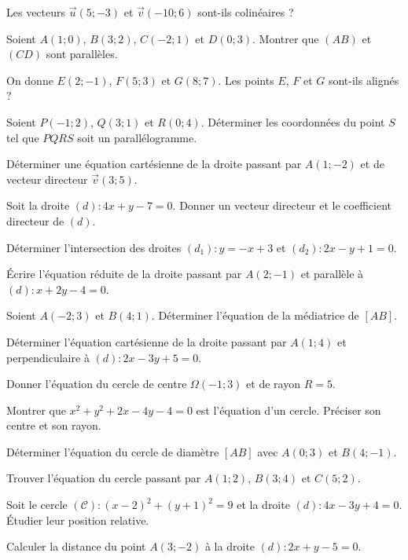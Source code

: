 \exo{}
Les vecteurs $\vec{u}(5; -3)$ et $\vec{v}(-10; 6)$ sont-ils colinéaires ?

\exo{}
Soient $A(1; 0)$, $B(3; 2)$, $C(-2; 1)$ et $D(0; 3)$. Montrer que $(AB)$ et $(CD)$ sont parallèles.

\exo{}
On donne $E(2; -1)$, $F(5; 3)$ et $G(8; 7)$. Les points $E$, $F$ et $G$ sont-ils alignés ?

\exo{}
Soient $P(-1; 2)$, $Q(3; 1)$ et $R(0; 4)$. Déterminer les coordonnées du point $S$ tel que $PQRS$ soit un parallélogramme.


\exo{}
Déterminer une équation cartésienne de la droite passant par $A(1; -2)$ et de vecteur directeur $\vec{v}(3; 5)$.

\exo{}
Soit la droite $(d) : 4x + y - 7 = 0$. Donner un vecteur directeur et le coefficient directeur de $(d)$.

\exo{}
Déterminer l'intersection des droites $(d_1) : y = -x + 3$ et $(d_2) : 2x - y + 1 = 0$.

\exo{}
Écrire l'équation réduite de la droite passant par $A(2; -1)$ et parallèle à $(d) : x + 2y - 4 = 0$.

\exo{}
Soient $A(-2; 3)$ et $B(4; 1)$. Déterminer l'équation de la médiatrice de $[AB]$.

\exo{}
Déterminer l'équation cartésienne de la droite passant par $A(1; 4)$ et perpendiculaire à $(d) : 2x - 3y + 5 = 0$.


\exo{}
Donner l'équation du cercle de centre $\Omega(-1; 3)$ et de rayon $R = 5$.

\exo{}
Montrer que $x^2 + y^2 + 2x - 4y - 4 = 0$ est l'équation d'un cercle. Préciser son centre et son rayon.

\exo{}
Déterminer l'équation du cercle de diamètre $[AB]$ avec $A(0; 3)$ et $B(4; -1)$.

\exo{}
Trouver l'équation du cercle passant par $A(1; 2)$, $B(3; 4)$ et $C(5; 2)$.


\exo{}
Soit le cercle $(\mathcal{C}) : (x-2)^2 + (y+1)^2 = 9$ et la droite $(d) : 4x - 3y + 4 = 0$. Étudier leur position relative.

\exo{}
Calculer la distance du point $A(3; -2)$ à la droite $(d) : 2x + y - 5 = 0$.

